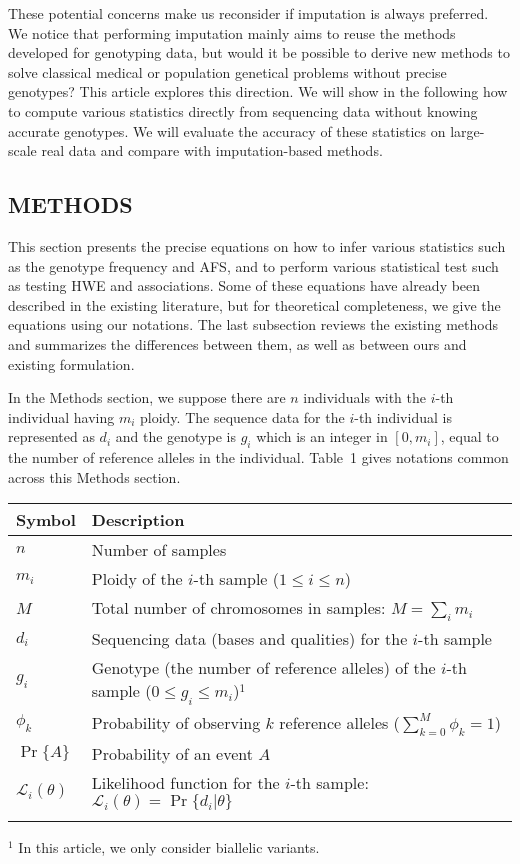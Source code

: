 \documentclass{bioinfo}
\begin{document}
These potential concerns make us reconsider if imputation is always preferred. We notice that performing imputation
mainly aims to reuse the methods developed for genotyping data,
but would it be possible to derive new methods to solve classical medical or population genetical
problems without precise genotypes? This article explores this direction. We will show
in the following how to compute various statistics directly from sequencing data without
knowing accurate genotypes. We will evaluate the accuracy of these statistics on large-scale
real data and compare with imputation-based methods.

\begin{methods}
\section{METHODS}
This section presents the precise equations on how to infer various statistics such as
the genotype frequency and AFS, and to perform various statistical test such as
testing HWE and associations. Some of these equations have already been described
in the existing literature, but for theoretical completeness, we give the equations
using our notations. The last subsection reviews the existing methods and summarizes
the differences between them, as well as between ours and existing formulation.

In the Methods section, we suppose there are $n$ individuals with the $i$-th
individual having $m_i$ ploidy. The sequence data for the $i$-th individual is
represented as $d_i$ and the genotype is $g_i$ which is an integer in $[0,m_i]$,
equal to the number of reference alleles in the individual.
Table~1 %
gives notations common across this Methods section.

\begin{table}[!htb]\label{tab:notation}
{\begin{tabular}{lp{7cm}}
\toprule
Symbol & Description \\
\midrule
$n$ & Number of samples \\
$m_i$ & Ploidy of the $i$-th sample ($1\le i\le n$)\\
$M$ & Total number of chromosomes in samples: $M=\sum_i m_i$\\
$d_i$ & Sequencing data (bases and qualities) for the $i$-th sample\\
$g_i$ & Genotype (the number of reference alleles) of the $i$-th sample \mbox{($0\le g_i\le m_i$)}$^1$\\
$\phi_k$ & Probability of observing $k$ reference alleles ($\sum_{k=0}^M\phi_k=1$) \\
$\Pr\{A\}$ & Probability of an event $A$\\
$\mathcal{L}_i(\theta)$ & Likelihood function for the $i$-th sample: $\mathcal{L}_i(\theta)=\Pr\{d_i|\theta\}$ \\
\botrule
\end{tabular}}{$^1$ In this article, we only consider biallelic variants.}
\end{table}


\end{methods}
\end{document}
